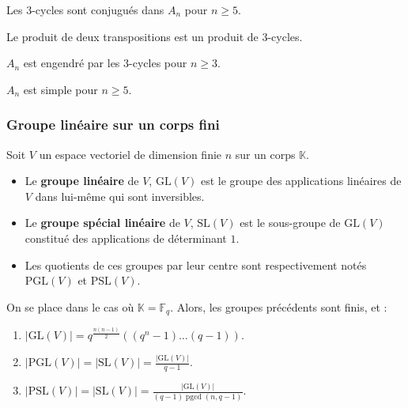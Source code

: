   \begin{lemma}
    Les $3$-cycles sont conjugués dans $A_n$ pour $n \geq 5$.
  \end{lemma}


  \begin{lemma}
    Le produit de deux transpositions est un produit de $3$-cycles.
  \end{lemma}

  \begin{proposition}
    $A_n$ est engendré par les $3$-cycles pour $n \geq 3$.
  \end{proposition}


  \begin{theorem}
    $A_n$ est simple pour $n \geq 5$.
  \end{theorem}

  \subsubsection{Groupe linéaire sur un corps fini}


  Soit $V$ un espace vectoriel de dimension finie $n$ sur un corps $\mathbb{K}$.

  \begin{definition}
    \begin{itemize}
      \item Le \textbf{groupe linéaire} de $V$, $\mathrm{GL}(V)$ est le groupe des applications linéaires de $V$ dans lui-même qui sont inversibles.
      \item Le \textbf{groupe spécial linéaire} de $V$, $\mathrm{SL}(V)$ est le sous-groupe de $\mathrm{GL}(V)$ constitué des applications de déterminant $1$.
      \item Les quotients de ces groupes par leur centre sont respectivement notés $\mathrm{PGL}(V)$ et $\mathrm{PSL}(V)$.
    \end{itemize}
  \end{definition}


  \begin{proposition}
    On se place dans le cas où $\mathbb{K} = \mathbb{F}_q$. Alors, les groupes précédents sont finis, et :
    \begin{enumerate}[label=(\roman*)]
      \item $|\mathrm{GL}(V)| = q^{\frac{n(n-1)}{2}}((q^n-1) \dots (q-1))$.
      \item $|\mathrm{PGL}(V)| = |\mathrm{SL}(V)| = \frac{|\mathrm{GL}(V)|}{q-1}$.
      \item $|\mathrm{PSL}(V)| = |\mathrm{SL}(V)| = \frac{|\mathrm{GL}(V)|}{(q-1)\operatorname{pgcd}(n,q-1)}$.
    \end{enumerate}
  \end{proposition}

